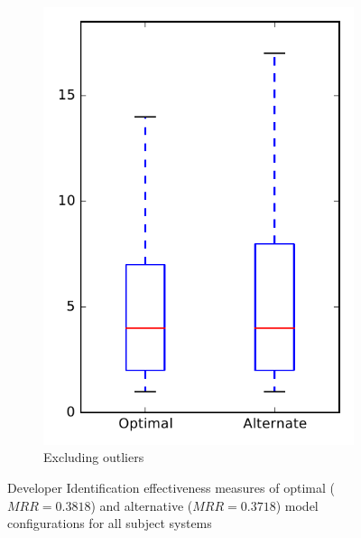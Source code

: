 \begin{figure}
\begin{subfigure}{.4\textwidth}
        \includegraphics[height=0.4\textheight]{figures/combo/dit_rq1_all_no_outlier}
        \caption{Excluding outliers}\label{fig:combo:dit:rq1:all_no_outlier}
    \end{subfigure}
\caption[Developer Identification effectiveness measures of optimal and alternative model configurations for all subject systems]%
{Developer Identification effectiveness measures of optimal ($MRR=0.3818$) and alternative ($MRR=0.3718$) model configurations for all subject systems}
\label{fig:combo:dit:rq1:all}
\end{figure}
